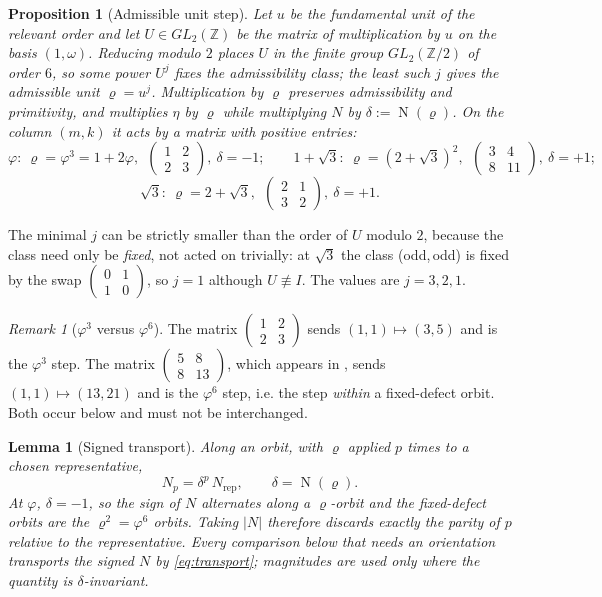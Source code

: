\documentclass[11pt]{article}
\newtheorem{proposition}[theorem]{Proposition}
\newtheorem{lemma}[theorem]{Lemma}
\theoremstyle{definition}
\theoremstyle{remark}
\newtheorem{remark}[theorem]{Remark}
\newcommand{\Z}{\mathbb{Z}}
\newcommand{\pr}{\varrho}
\DeclareMathOperator{\Nm}{N}
\newcommand{\mat}[4]{\left(\begin{smallmatrix}#1&#2\\#3&#4\end{smallmatrix}\right)}
\begin{document}
\begin{proposition}[Admissible unit step]\label{prop:unit}
Let $u$ be the fundamental unit of the relevant order and let $U\in GL_2(\Z)$ be the matrix of
multiplication by $u$ on the basis $(1,\omega)$. Reducing modulo $2$ places $U$ in the finite
group $GL_2(\Z/2)$ of order $6$, so some power $U^j$ fixes the admissibility class; the least
such $j$ gives the \emph{admissible unit} $\pr=u^j$. Multiplication by $\pr$ preserves
admissibility and primitivity, and multiplies $\eta$ by $\pr$ while multiplying $N$ by
$\delta:=\Nm(\pr)$. On the column $(m,k)$ it acts by a matrix with positive entries:
\[
\varphi:\ \pr=\varphi^3=1+2\varphi,\ \ \begin{pmatrix}1&2\\2&3\end{pmatrix},\ \delta=-1;\qquad
1+\sqrt3:\ \pr=(2+\sqrt3)^2,\ \ \begin{pmatrix}3&4\\8&11\end{pmatrix},\ \delta=+1;
\]
\[
\sqrt3:\ \pr=2+\sqrt3,\ \ \begin{pmatrix}2&1\\3&2\end{pmatrix},\ \delta=+1 .
\]
\end{proposition}

The minimal $j$ can be strictly smaller than the order of $U$ modulo $2$, because the class
need only be \emph{fixed}, not acted on trivially: at $\sqrt3$ the class (odd,\,odd) is fixed by
the swap $\mat{0}{1}{1}{0}$, so $j=1$ although $U\not\equiv I$. The values are $j=3,2,1$.

\begin{remark}[$\varphi^3$ versus $\varphi^6$]\label{rem:phi3}
The matrix $\mat{1}{2}{2}{3}$ sends $(1,1)\mapsto(3,5)$ and is the $\varphi^3$ step. The
matrix $\mat{5}{8}{8}{13}$, which appears in \cite{DeJesus2026}, sends $(1,1)\mapsto(13,21)$
and is the $\varphi^6$ step, i.e. the step \emph{within} a fixed-defect orbit. Both occur below
and must not be interchanged.
\end{remark}

\begin{lemma}[Signed transport]\label{lem:transport}
Along an orbit, with $\pr$ applied $p$ times to a chosen representative,
\begin{equation}\label{eq:transport}
N_p=\delta^p\,N_{\mathrm{rep}},\qquad \delta=\Nm(\pr).
\end{equation}
At $\varphi$, $\delta=-1$, so the \emph{sign} of $N$ alternates along a $\pr$-orbit and the
fixed-defect orbits are the $\pr^2=\varphi^6$ orbits. Taking $|N|$ therefore discards exactly
the parity of $p$ relative to the representative. Every comparison below that needs an
orientation transports the signed $N$ by \eqref{eq:transport}; magnitudes are used only where
the quantity is $\delta$-invariant.
\end{lemma}
\end{document}

